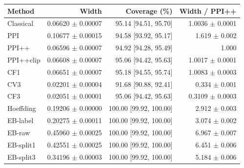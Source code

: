 \small
\begin{tabular}{lrrr}
\toprule
Method & Width & Coverage (\%) & Width / PPI++ \\
\midrule
Classical & 0.06620 $\pm$ 0.00007 & 95.14 [94.51, 95.70] & 1.0036 $\pm$ 0.0001 \\
PPI & 0.10677 $\pm$ 0.00015 & 94.58 [93.92, 95.17] & 1.619 $\pm$ 0.002 \\
PPI++ & 0.06596 $\pm$ 0.00007 & 94.92 [94.28, 95.49] & 1.000 \\
PPI++clip & 0.06608 $\pm$ 0.00007 & 95.06 [94.42, 95.63] & 1.0017 $\pm$ 0.0001 \\
CF1 & 0.06651 $\pm$ 0.00007 & 95.18 [94.55, 95.74] & 1.0083 $\pm$ 0.0003 \\
CV3 & 0.02201 $\pm$ 0.00004 & 91.68 [90.88, 92.41] & 0.334 $\pm$ 0.001 \\
CF3 & 0.02051 $\pm$ 0.00001 & 95.06 [94.42, 95.63] & 0.3109 $\pm$ 0.0003 \\
Hoeffding & 0.19206 $\pm$ 0.00000 & 100.00 [99.92, 100.00] & 2.912 $\pm$ 0.003 \\
EB-label & 0.20275 $\pm$ 0.00011 & 100.00 [99.92, 100.00] & 3.074 $\pm$ 0.002 \\
EB-raw & 0.45960 $\pm$ 0.00025 & 100.00 [99.92, 100.00] & 6.967 $\pm$ 0.007 \\
EB-split1 & 0.42551 $\pm$ 0.00025 & 100.00 [99.92, 100.00] & 6.451 $\pm$ 0.006 \\
EB-split3 & 0.34196 $\pm$ 0.00003 & 100.00 [99.92, 100.00] & 5.184 $\pm$ 0.006 \\
\bottomrule
\end{tabular}

